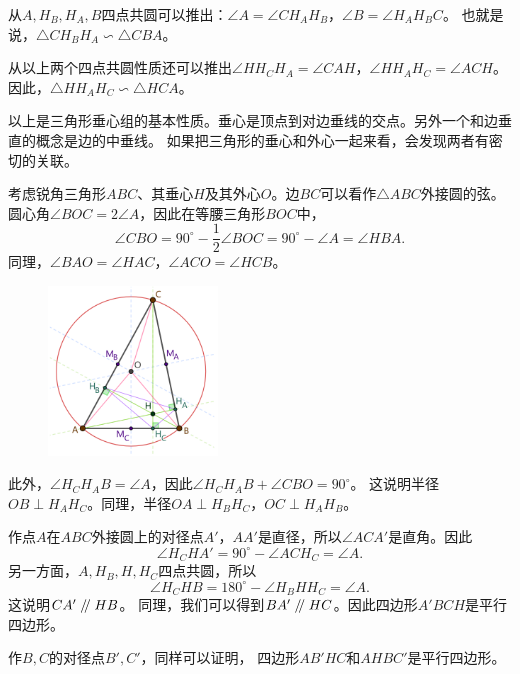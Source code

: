\documentclass[12pt,UTF8]{ctexbook}
\renewcommand\parallel{\mathrel{/\mskip-4mu/}}
\begin{document}
从$A, H_B, H_A, B$四点共圆可以推出：$\angle A = \angle CH_AH_B$，$\angle B = \angle H_AH_BC$。
也就是说，$\triangle CH_BH_A \backsim \triangle CBA$。

从以上两个四点共圆性质还可以推出$\angle HH_CH_A = \angle CAH$，$\angle HH_AH_C = \angle ACH$。
因此，$\triangle HH_AH_C \backsim \triangle HCA$。

以上是三角形垂心组的基本性质。垂心是顶点到对边垂线的交点。另外一个和边垂直的概念是边的中垂线。
如果把三角形的垂心和外心一起来看，会发现两者有密切的关联。

考虑锐角三角形$ABC$、其垂心$H$及其外心$O$。边$BC$可以看作$\triangle ABC$外接圆的弦。
圆心角$\angle BOC = 2\angle A$，因此在等腰三角形$BOC$中，
$$\angle CBO = 90^\circ - \frac{1}{2}\angle BOC = 90^\circ - \angle A = \angle HBA.$$
同理，$\angle BAO = \angle HAC$，$\angle ACO = \angle HCB$。

\begin{figure} %
    \vspace{-50pt}
    \flushright
    \includegraphics[width=0.4\textwidth]{tu/垂心与外心2.png}
\end{figure}

此外，$\angle H_CH_AB = \angle A$，因此$\angle H_CH_AB + \angle CBO = 90^\circ$。
这说明半径$OB \perp H_AH_C$。同理，半径$OA \perp H_BH_C$，$OC \perp H_AH_B$。

作点$A$在$ABC$外接圆上的对径点$A'$，$AA'$是直径，所以$\angle ACA'$是直角。因此
$$ \angle H_CHA' = 90^\circ - \angle ACH_C = \angle A.$$
另一方面，$A, H_B, H, H_C$四点共圆，所以
$$ \angle H_CHB = 180^\circ - \angle H_BHH_C = \angle A.$$
这说明$CA' \parallel HB$。
同理，我们可以得到$BA' \parallel HC$。因此四边形$A'BCH$是平行四边形。

作$B,C$的对径点$B', C'$，同样可以证明，
四边形$AB'HC$和$AHBC'$是平行四边形。
\end{document}
